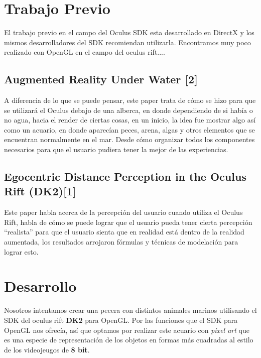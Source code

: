 \documentclass[10pt, a4paper, twocolumn]{article}
\begin{document}
\section{Trabajo Previo}

El trabajo previo en el campo del Oculus SDK esta desarrollado en DirectX y los mismos desarrolladores del SDK recomiendan utilizarla. Encontramos muy poco realizado con OpenGL en el campo del oculus rift....


\subsection{Augmented Reality Under Water [2]}
A diferencia de lo que se puede pensar, este paper trata de cómo se hizo para que se utilizará el Oculus debajo de una alberca, en donde dependiendo de si había o no agua, hacia el render de ciertas cosas, en un inicio, la idea fue mostrar algo así como un acuario, en donde aparecían peces, arena, algas y otros elementos que se encuentran normalmente en el mar. Desde cómo organizar todos los componentes necesarios para que el usuario pudiera tener la mejor de las experiencias.

\subsection{Egocentric Distance Perception in the Oculus Rift (DK2)[1]}
Este paper habla acerca de la percepción del usuario cuando utiliza el Oculus Rift, habla de cómo se puede lograr que el usuario pueda tener cierta percepción “realista” para que el usuario sienta que en realidad está dentro de la realidad aumentada, los resultados arrojaron fórmulas y técnicas de modelación para lograr esto.

\section{Desarrollo}
Nosotros intentamos crear una pecera  con distintos animales marinos utilisando el SDK del oculus rift  \textbf{DK2} para OpenGL. Por las funciones que el SDK para OpenGL nos ofrecía, así que optamos por realizar este acuario con \textit{pixel art} que es una especie de representación de los objetos en formas más cuadradas al estilo de los videojeugos de \textbf{8 bit}.
\end{document}
